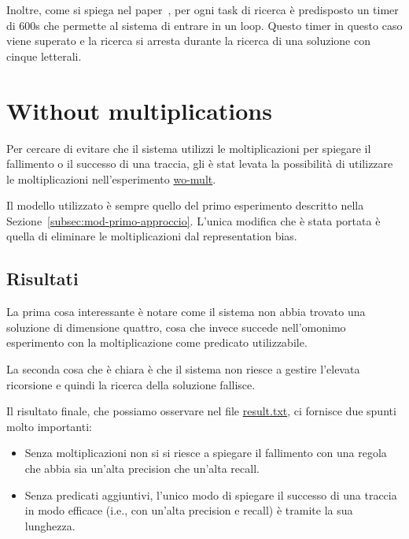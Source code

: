 Inoltre, come si spiega nel paper~\cite{numsynth}, per ogni task di ricerca è predisposto un timer di 600s che permette al sistema di entrare in un loop. Questo timer in questo caso viene superato e la ricerca si arresta durante la ricerca di una soluzione con cinque letterali.

\section{Without multiplications}
\label{sec:wo-mult}
Per cercare di evitare che il sistema utilizzi le moltiplicazioni per spiegare il fallimento o il successo di una traccia, gli è stat levata la possibilità di utilizzare le moltiplicazioni nell'esperimento \href{https://github.com/edoardosarri24/numsynth/tree/main/my-experiments/4-wo-mult/}{wo-mult}.

Il modello utilizzato è sempre quello del primo esperimento descritto nella Sezione~\ref{subsec:mod-primo-approccio}. L'unica modifica che è stata portata è quella di eliminare le moltiplicazioni dal representation bias.

\subsection{Risultati}
La prima cosa interessante è notare come il sistema non abbia trovato una soluzione di dimensione quattro, cosa che invece succede nell'omonimo esperimento con la moltiplicazione come predicato utilizzabile.

La seconda cosa che è chiara è che il sistema non riesce a gestire l'elevata ricorsione e quindi la ricerca della soluzione fallisce.

\myskip

Il risultato finale, che possiamo osservare nel file \href{https://github.com/edoardosarri24/numsynth/tree/main/my-experiments/4-wo-mult/result.txt}{result.txt}, ci fornisce due spunti molto importanti:
\begin{itemize}
    \item Senza moltiplicazioni non si si riesce a spiegare il fallimento con una regola che abbia sia un'alta precision che un'alta recall.
    \item Senza predicati aggiuntivi, l'unico modo di spiegare il successo di una traccia in modo efficace (i.e., con un'alta precision e recall) è tramite la sua lunghezza.
\end{itemize}

